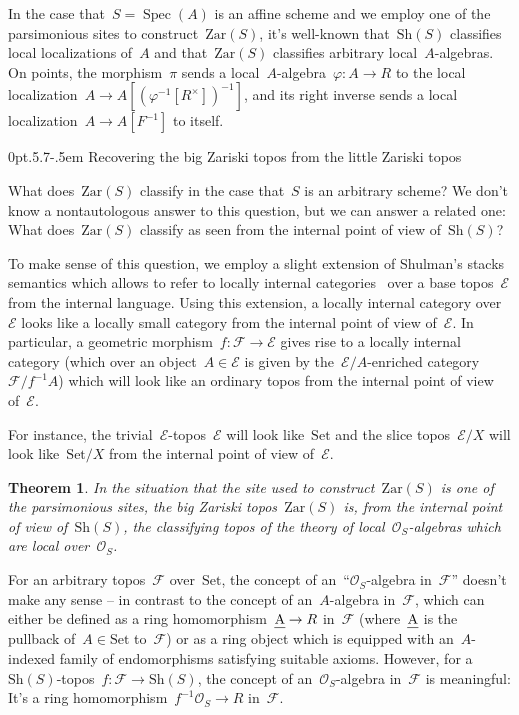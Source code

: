 \documentclass[10pt,reqno,a4paper]{amsbook}
\makeatletter
\theoremstyle{definition}
\theoremstyle{plain}
\newtheorem{thm}[defn]{Theorem}
\theoremstyle{remark}
\newcommand{\E}{\mathcal{E}}
\newcommand{\F}{\mathcal{F}}
\renewcommand{\O}{\mathcal{O}}
\let\oldul\ul
\renewcommand{\ul}[1]{\text{\oldul{$#1$}}}
\newcommand{\Set}{\mathrm{Set}}
\newcommand{\Sh}{\mathrm{Sh}}
\newcommand{\Zar}{\mathrm{Zar}}
\DeclareMathOperator{\Spec}{Spec}
\newcommand{\?}{\,{:}\,}
\renewcommand{\_}{\mathpunct{.}\,}
\def\subsection{\@startsection{subsection}{2}%
  {0pt}{.5\linespacing\@plus.7\linespacing}{-.5em}%
  {\normalfont\bfseries}}
\makeatother
\begin{document}
In the case that~$S = \Spec(A)$ is an affine scheme and we employ
one of the parsimonious sites to construct~$\Zar(S)$, it's well-known
that~$\Sh(S)$ classifies local localizations of~$A$ and that~$\Zar(S)$ classifies
arbitrary local~$A$-algebras. On points, the morphism~$\pi$ sends a
local~$A$-algebra~$\varphi : A \to R$ to the local localization~$A \to
A[(\varphi^{-1}[R^\times])^{-1}]$, and its right inverse sends a local
localization~$A \to A[F^{-1}]$ to itself.


\subsection{Recovering the big Zariski topos from the little Zariski topos}

What does~$\Zar(S)$ classify in the case that~$S$ is an arbitrary scheme?
We don't know a nontautologous answer to this question, but we can answer a
related one: What does~$\Zar(S)$ classify as seen from the internal point of
view of~$\Sh(S)$?

To make sense of this question, we employ a slight extension of Shulman's
stacks semantics which allows to refer to locally internal
categories~\cite{penon:locally-internal-categories} over a base topos~$\E$ from
the internal language. Using this extension, a locally internal category
over~$\E$ looks like a locally small category from the internal point of view
of~$\E$. In particular, a geometric morphism~$f : \F \to \E$ gives rise to a
locally internal category (which over an object~$A \in \E$ is given by
the~$\E/A$-enriched category~$\F/f^{-1}A$) which will look like an ordinary
topos from the internal point of view of~$\E$.

For instance, the trivial~$\E$-topos~$\E$ will look like~$\Set$ and the
slice topos~$\E/X$ will look like~$\Set/X$ from the internal point of
view of~$\E$.

\begin{thm}\label{thm:zar-classifies}
In the situation that the site used to construct~$\Zar(S)$ is one of the
parsimonious sites, the big Zariski topos~$\Zar(S)$ is, from the internal point
of view of~$\Sh(S)$, the classifying topos of
the theory of local~$\O_S$-algebras which are local over~$\O_S$.
\end{thm}

For an arbitrary topos~$\F$ over~$\Set$, the concept of an~``$\O_S$-algebra
in~$\F$'' doesn't make any sense -- in contrast to the concept of
an~$A$-algebra in~$\F$, which can either be defined as a ring
homomorphism~$\ul{A} \to R$ in~$\F$ (where~$\ul{A}$ is the pullback of~$A \in
\Set$ to~$\F$) or as a ring object which is equipped with an~$A$-indexed family of
endomorphisms satisfying suitable axioms. However, for a~$\Sh(S)$-topos~$f : \F \to
\Sh(S)$, the concept of an~$\O_S$-algebra in~$\F$ is meaningful: It's a ring
homomorphism~$f^{-1}\O_S \to R$ in~$\F$.
\end{document}
